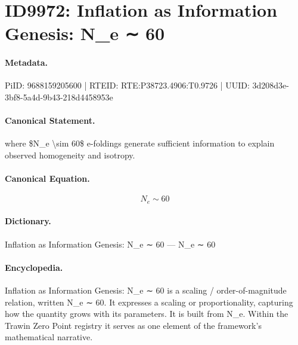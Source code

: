 \section*{ID9972: Inflation as Information Genesis: N\_e ∼ 60}
\paragraph{Metadata.}
PiID: 9688159205600 | RTEID: RTE:P38723.4906:T0.9726 | UUID: 3d208d3e-3bf8-5a4d-9b43-218d4458953e

\paragraph{Canonical Statement.}
where \$N\_e \textbackslash{}sim 60\$ e-foldings generate sufficient information to explain observed homogeneity and isotropy.

\paragraph{Canonical Equation.}
\[
N_e \sim 60
\]

\paragraph{Dictionary.}
Inflation as Information Genesis: N\_e ∼ 60 — N\_e ∼ 60

\paragraph{Encyclopedia.}
Inflation as Information Genesis: N\_e ∼ 60 is a scaling / order-of-magnitude relation, written N\_e ∼ 60. It expresses a scaling or proportionality, capturing how the quantity grows with its parameters. It is built from N\_e. Within the Trawin Zero Point registry it serves as one element of the framework's mathematical narrative.
